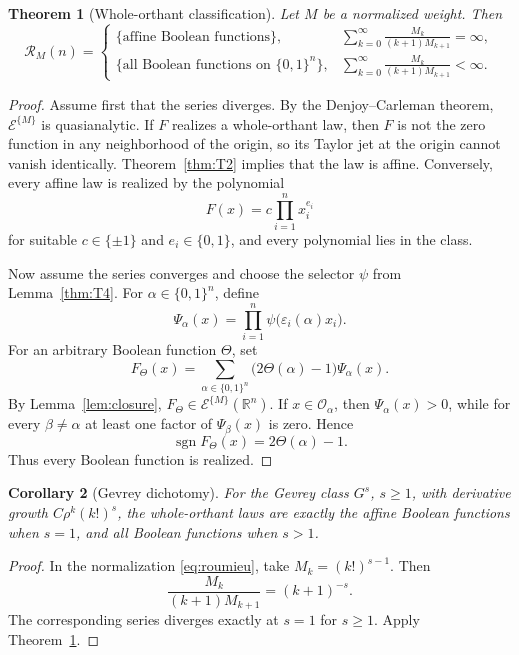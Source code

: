 \documentclass[11pt]{article}
\newtheorem{theorem}{Theorem}[section]
\newtheorem{corollary}[theorem]{Corollary}
\theoremstyle{definition}
\theoremstyle{remark}
\newcommand{\R}{\mathbb{R}}
\newcommand{\bits}{\{0,1\}}
\newcommand{\sign}{\operatorname{sgn}}
\newcommand{\eps}{\varepsilon}
\begin{document}
\begin{theorem}[Whole-orthant classification]\label{thm:T5}
Let $M$ be a normalized weight. Then
\[
 \mathcal{R}_M(n)=
 \begin{cases}
 \{\text{affine Boolean functions}\},
 &\displaystyle\sum_{k=0}^{\infty}\frac{M_k}{(k+1)M_{k+1}}=\infty,\\[1.1em]
 \{\text{all Boolean functions on }\bits^n\},
 &\displaystyle\sum_{k=0}^{\infty}\frac{M_k}{(k+1)M_{k+1}}<\infty.
 \end{cases}
\]
\end{theorem}

\begin{proof}
Assume first that the series diverges. By the Denjoy--Carleman theorem, $\mathcal{E}^{\{M\}}$ is quasianalytic. If $F$ realizes a whole-orthant law, then $F$ is not the zero function in any neighborhood of the origin, so its Taylor jet at the origin cannot vanish identically. Theorem~\ref{thm:T2} implies that the law is affine. Conversely, every affine law is realized by the polynomial
\[
 F(x)=c\prod_{i=1}^n x_i^{e_i}
\]
for suitable $c\in\{\pm1\}$ and $e_i\in\bits$, and every polynomial lies in the class.

Now assume the series converges and choose the selector $\psi$ from Lemma~\ref{thm:T4}. For $\alpha\in\bits^n$, define
\[
 \Psi_\alpha(x)
 =\prod_{i=1}^n\psi\bigl(\eps_i(\alpha)x_i\bigr).
\]
For an arbitrary Boolean function $\Theta$, set
\begin{equation}\label{eq:booleanselector}
 F_\Theta(x)
 =\sum_{\alpha\in\bits^n}
 \bigl(2\Theta(\alpha)-1\bigr)\Psi_\alpha(x).
\end{equation}
By Lemma~\ref{lem:closure}, $F_\Theta\in\mathcal{E}^{\{M\}}(\R^n)$. If $x\in\mathcal{O}_\alpha$, then $\Psi_\alpha(x)>0$, while for every $\beta\ne\alpha$ at least one factor of $\Psi_\beta(x)$ is zero. Hence
\[
 \sign F_\Theta(x)=2\Theta(\alpha)-1.
\]
Thus every Boolean function is realized.
\end{proof}

\begin{corollary}[Gevrey dichotomy]\label{cor:gevrey}
For the Gevrey class $G^s$, $s\ge1$, with derivative growth $C\rho^k(k!)^s$, the whole-orthant laws are exactly the affine Boolean functions when $s=1$, and all Boolean functions when $s>1$.
\end{corollary}

\begin{proof}
In the normalization \eqref{eq:roumieu}, take $M_k=(k!)^{s-1}$. Then
\[
 \frac{M_k}{(k+1)M_{k+1}}=(k+1)^{-s}.
\]
The corresponding series diverges exactly at $s=1$ for $s\ge1$. Apply Theorem~\ref{thm:T5}.
\end{proof}
\end{document}
